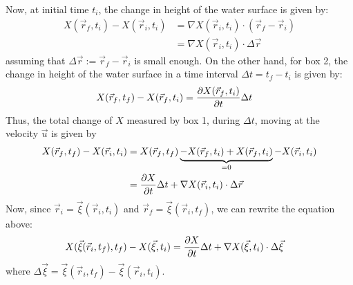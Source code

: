 Now, at initial time $t_i$, the change in height of the water surface is given by:
\begin{align}
  X(\vec{r}_f, t_i) - X(\vec{r}_i, t_i) & = \nabla X(\vec{r}_i, t_i) \cdot (\vec{r}_f - \vec{r}_i) \\
                                        & = \nabla X(\vec{r}_i, t_i) \cdot \Delta \vec{r}
\end{align}
assuming that $\Delta \vec{r} := \vec{r}_f - \vec{r}_i$ is small enough.
On the other hand, for box 2, the change in height of the water surface in a time interval $\Delta t = t_f - t_i$ is given by:
\begin{align}
  X(\vec{r}_f, t_f) - X(\vec{r}_f, t_i) & = \pdv{X(\vec{r}_f, t_i)}{t} \Delta t
\end{align}
Thus, the total change of $X$ measured by box 1, during $\Delta t$, moving at the velocity $\vec{u}$ is given by
\begin{align}
  X(\vec{r}_f, t_f) - X(\vec{r}_i, t_i)
   & = X(\vec{r}_f, t_f) \underbrace{
    - X(\vec{r}_f, t_i)
    + X(\vec{r}_f, t_i)
  }_{=0} - X(\vec{r}_i, t_i)                                               \\
   & = \pdv{X}{t} \Delta t + \nabla X(\vec{r}_i, t_i) \cdot \Delta \vec{r}
\end{align}
Now, since $\vec{r}_i = \vec{\xi}(\vec{r}_i, t_i)$ and $\vec{r}_f = \vec{\xi}(\vec{r}_i, t_f)$, we can rewrite the equation above:
\begin{align}
  X(\vec{\xi}(\vec{r}_i, t_f), t_f) - X(\vec{\xi}, t_i) & = \pdv{X}{t} \Delta t + \nabla X(\vec{\xi}, t_i) \cdot \Delta \vec{\xi}
\end{align}
where $\Delta \vec{\xi} = \vec{\xi}(\vec{r}_i, t_f) - \vec{\xi}(\vec{r}_i, t_i)$.

